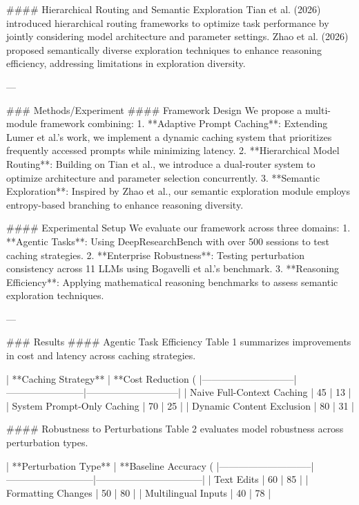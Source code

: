 #### Hierarchical Routing and Semantic Exploration  
Tian et al. (2026) introduced hierarchical routing frameworks to optimize task performance by jointly considering model architecture and parameter settings. Zhao et al. (2026) proposed semantically diverse exploration techniques to enhance reasoning efficiency, addressing limitations in exploration diversity.   

---

### Methods/Experiment  
#### Framework Design  
We propose a multi-module framework combining:  
1. **Adaptive Prompt Caching**: Extending Lumer et al.'s work, we implement a dynamic caching system that prioritizes frequently accessed prompts while minimizing latency.  
2. **Hierarchical Model Routing**: Building on Tian et al., we introduce a dual-router system to optimize architecture and parameter selection concurrently.  
3. **Semantic Exploration**: Inspired by Zhao et al., our semantic exploration module employs entropy-based branching to enhance reasoning diversity.  

#### Experimental Setup  
We evaluate our framework across three domains:  
1. **Agentic Tasks**: Using DeepResearchBench with over 500 sessions to test caching strategies.  
2. **Enterprise Robustness**: Testing perturbation consistency across 11 LLMs using Bogavelli et al.'s benchmark.  
3. **Reasoning Efficiency**: Applying mathematical reasoning benchmarks to assess semantic exploration techniques.  

---

### Results  
#### Agentic Task Efficiency  
Table 1 summarizes improvements in cost and latency across caching strategies.  

| **Caching Strategy**       | **Cost Reduction (%
|-----------------------------|------------------------|-----------------------------|  
| Naive Full-Context Caching  | 45                    | 13                          |  
| System Prompt-Only Caching  | 70                    | 25                          |  
| Dynamic Content Exclusion   | 80                    | 31                          |  

#### Robustness to Perturbations  
Table 2 evaluates model robustness across perturbation types.  

| **Perturbation Type**       | **Baseline Accuracy (%
|-----------------------------|---------------------------|---------------------------------|  
| Text Edits                  | 60                        | 85                              |  
| Formatting Changes          | 50                        | 80                              |  
| Multilingual Inputs         | 40                        | 78                              |  

